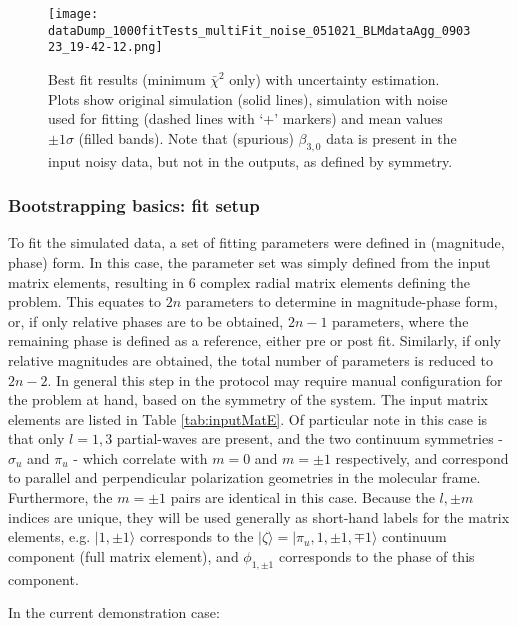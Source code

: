 \documentclass[10pt]{article}
\begin{document}
\begin{figure}[]
\begin{center}
\texttt{[image: dataDump\_1000fitTests\_multiFit\_noise\_051021\_BLMdataAgg\_090323\_19-42-12.png]}
\caption{Best fit results (minimum \(\bar{\chi}^2\) only) with uncertainty estimation. Plots show original simulation (solid lines), simulation with noise used for fitting (dashed lines with `+' markers) and mean values \(\pm1\sigma\) (filled bands). Note that (spurious) \(\beta_{3,0}\) data is present in the input noisy data, but not in the outputs, as defined by symmetry.\label{743962}}
\end{center}
\end{figure}

\subsubsection{Bootstrapping basics: fit setup}

To fit the simulated data, a set of fitting parameters were defined in (magnitude, phase) form. In this case, the parameter set was simply defined from the input matrix elements, resulting in 6 complex radial matrix elements defining the problem. This equates to $2n$ parameters to determine in magnitude-phase form, or, if only relative phases are to be obtained, $2n-1$ parameters, where the remaining phase is defined as a reference, either pre or post fit. Similarly, if only relative magnitudes are obtained, the total number of parameters is reduced to $2n-2$. In general this step in the protocol may require manual configuration for the problem at hand, based on the symmetry of the system. The input matrix elements are listed in Table \ref{tab:inputMatE}. Of particular note in this case is that only $l=1,3$ partial-waves are present, and the two continuum symmetries - $\sigma_u$ and $\pi_u$ - which correlate with $m=0$ and $m=\pm1$ respectively, and correspond to parallel and perpendicular polarization geometries in the molecular frame. Furthermore, the $m=\pm1$ pairs are identical in this case. Because the $l,\pm m$ indices are unique, they will be used generally as short-hand labels for the matrix elements, e.g. $|1,\pm1\rangle$ corresponds to the $|\zeta\rangle = |\pi_u,1,\pm 1,\mp 1 \rangle$ continuum component (full matrix element), and $\phi_{1,\pm1}$ corresponds to the phase of this component.

In the current demonstration case:
\end{document}
